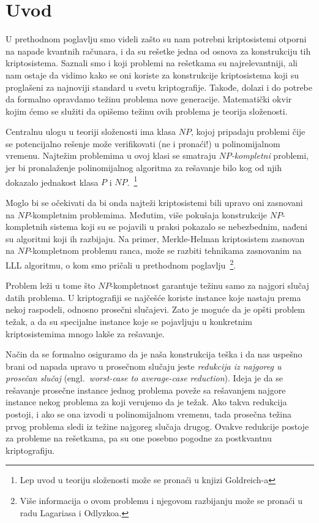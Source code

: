 
\section{Uvod}

U prethodnom poglavlju smo videli zašto su nam potrebni kriptosistemi otporni
na napade kvantnih računara, i da su rešetke jedna od osnova za konstrukciju tih kriptosistema.
Saznali smo i koji problemi na rešetkama su najrelevantniji, 
ali nam ostaje da vidimo kako se oni koriste za konstrukcije kriptosistema koji su proglašeni za najnoviji standard u svetu kriptografije.
Takođe, dolazi i do potrebe da formalno opravdamo težinu problema nove generacije.
Matematički okvir kojim ćemo se služiti da opišemo težinu ovih problema je teorija složenosti.

Centralnu ulogu u teoriji složenosti ima klasa $NP$,
kojoj pripadaju problemi čije se potencijalno rešenje može verifikovati (ne i pronaći!) u polinomijalnom vremenu.
Najtežim problemima u ovoj klasi se smatraju \emph{$NP$-kompletni} problemi,
jer bi pronalaženje polinomijalnog algoritma za rešavanje bilo kog od njih
dokazalo jednakost klasa $P$ i $NP$.~\cite{goldreich2008complexity}\footnote{Lep uvod u teoriju složenosti može se pronaći u knjizi Goldreich-a}

Moglo bi se očekivati da bi onda najteži kriptosistemi bili upravo oni zasnovani na $NP$-kompletnim problemima.
Međutim, više pokušaja konstrukcije $NP$-kompletnih sistema koji su se pojavili u praksi pokazalo se nebezbednim,
nađeni su algoritmi koji ih razbijaju.
Na primer, Merkle-Helman kriptosistem zasnovan na $NP$-kompletnom problemu ranca,
može se razbiti tehnikama zasnovanim na LLL algoritmu, o kom smo pričali u prethodnom poglavlju~\cite{lagariasOdlyzko1985}\footnote{Više informacija o ovom problemu i njegovom razbijanju može se pronaći u radu Lagariasa i Odlyzkoa.}.

Problem leži u tome što $NP$-kompletnost garantuje težinu samo za najgori slučaj datih problema.
U kriptografiji se najčešće koriste instance koje nastaju prema nekoj raspodeli, odnosno prosečni slučajevi.
Zato je moguće da je opšti problem težak, 
a da su specijalne instance koje se pojavljuju u konkretnim kriptosistemima mnogo lakše za rešavanje.

Način da se formalno osiguramo da je naša konstrukcija teška i da nas uspešno brani od napada upravo u prosečnom slučaju
jeste \emph{redukcija iz najgoreg u prosečan slučaj} (engl.\ \emph{worst-case to average-case reduction}).
Ideja je da se rešavanje prosečne instance jednog problema poveže sa rešavanjem najgore
instance nekog problema za koji verujemo da je težak.
Ako takva redukcija postoji, 
i ako se ona izvodi u polinomijalnom vremenu,
tada prosečna težina prvog problema sledi iz težine najgoreg slučaja drugog.
Ovakve redukcije postoje za probleme na rešetkama,
pa su one posebno pogodne za postkvantnu kriptografiju.

